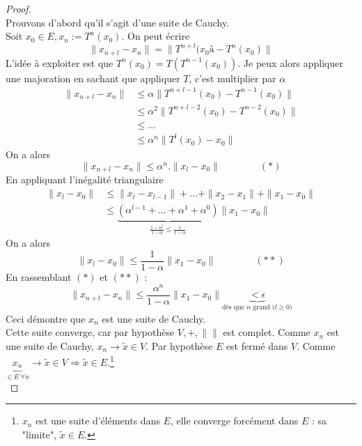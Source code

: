 	\begin{proof}\ \\	
	Prouvons d'abord qu'il s'agit d'une suite de Cauchy.\\
	Soit $x_0 \in E, x_n := T^n(x_0)$. On peut écrire
	\begin{equation}
	\| x_{n+l} - x_n\| = \| T^{n+l}(x_0à-T^n(x_0)\|
	\end{equation}
	L'idée à exploiter est que $T^n(x_0) = T(T^{n-1}(x_0))$. Je peux alors appliquer 
	une majoration en sachant que appliquer $T$, c'est multiplier par $\alpha$
	\begin{equation}
	\begin{array}{ll}
	\| x_{n+l} - x_n\| &\leq \alpha \|T^{n+l-1}(x_0) - T^{n-1}(x_0)\|\\
	 &\leq \alpha^2 \|T^{n+l-2}(x_0) - T^{n-2}(x_0)\|\\	
	 & \leq \dots\\
	 &\leq \alpha^n \|T^{l}(x_0) - x_0\|
	\end{array}
	\end{equation}
	On a alors
	\begin{equation}
	\| x_{n+l} - x_n\| \leq \alpha^n . \|x_l-x_0\|\qquad\qquad (*)
	\end{equation}
	En appliquant l'inégalité triangulaire 
	\begin{equation}
	\begin{array}{ll}
	\|x_l-x_0\| &\leq \|x_l-x_{l-1}\| + \dots + \|x_2-x_1\| + \|x_1-x_0\|\\
	 &\leq \underbrace{(\alpha^{l-1} + \dots + \alpha^1 + \alpha^0)}_{\frac{1-\alpha^l}{
	 1-\alpha} \leq \frac{1}{1-\alpha}}\|x_1-x_0\|
	\end{array}
	\end{equation}
	On a alors
	\begin{equation}
	\|x_l-x_0\| \leq \frac{1}{1-\alpha}\|x_1-x_0\|\qquad\qquad (**)
	\end{equation}
	En rassemblant $(*)$ et $(**)$ :
	\begin{equation}
	\|x_{n+l}-x_n\| \leq \frac{\alpha^n}{1-\alpha}\|x_1-x_0\| \underbrace{<\epsilon}_{\text{
	dès que $n$ grand ($l\geq0$)}}
	\end{equation}
	Ceci démontre que $x_n$ est une suite de Cauchy.\\
	
	Cette suite converge, car par hypothèse $V,+,\| \|$ est complet. Comme $x_n$ est 
	une suite de Cauchy, $x_n \rightarrow \tilde{x}\in V$. Par hypothèse $E$ est 
	fermé dans $V$. Comme $\underbrace{x_n}_{\in E\ \forall n} \rightarrow \tilde{x}
	\in V \Rightarrow \tilde{x}\in E$.\footnote{$x_n$ est une suite d’éléments dans $E$, 
	elle converge forcément dans $E$ : sa "limite", $\tilde{x}\in E$.}\\
	

\end{proof}
